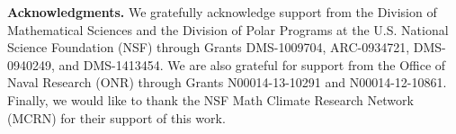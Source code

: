\documentclass{cmslatex}
\begin{document}
\medskip

{\bf Acknowledgments.}
We gratefully acknowledge support from the Division of Mathematical
Sciences and the Division of Polar Programs at the U.S. National
Science Foundation (NSF) through Grants DMS-1009704, ARC-0934721,
DMS-0940249, and DMS-1413454. We are also grateful for support from
the Office of Naval Research (ONR) through Grants N00014-13-10291 and
N00014-12-10861. Finally, we would like to thank the NSF Math Climate
Research Network (MCRN) for their support of this work. 



\medskip



\end{document}
